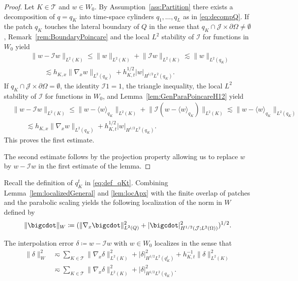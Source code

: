 \documentclass{amsart}
\providecommand{\tria}{\mathcal{T}}
\newcommand{\cJ}{\mathcal J}
\begin{document}
\begin{proof}
Let $K\in \tria$ and $w \in W_0$.
By Assumption~\ref{ass:Partition} there exists a decomposition of $q = q_K$ into time-space cylinders $q_1,\dots,q_L$ as in \eqref{eq:decompQ}. If the patch $q_K$ touches the lateral boundary of $Q$ in the sense that $q_K \cap \cJ\times \partial \Omega \neq \emptyset$, Remark~\ref{rem:BoundaryPoincare} and the local $L^2$ stability of $\mathcal{I}$ for functions in $W_0$ yield
\begin{align*}
&\lVert w - \mathcal{I} w \rVert_{L^2(K)} \leq \lVert w \rVert_{L^2(K)} + \lVert \mathcal{I} w \rVert_{L^2(K)} \lesssim \lVert w \rVert_{L^2(q_K)}\\
&\qquad \lesssim h_{K,x} \lVert \nabla_x w \rVert_{L^2(q_K)} + h_{K,t}^{1/2} \lvert w\rvert_{H^{1/2}L^2(q_K)}.
\end{align*}
%
If $q_K \cap \cJ\times \partial \Omega = \emptyset$, the identity $\mathcal{I}1 = 1$, the triangle inequality, the local $L^2$ stability of $\mathcal{I}$ for functions in $W_0$, and Lemma~\ref{lem:GenParaPoincareH12} yield
\begin{align*}
&\lVert w - \mathcal{I} w \rVert_{L^2(K)} \leq \lVert w - \langle w \rangle_{q_K}\rVert_{L^2(K)} + \lVert \mathcal{I} (w-\langle w \rangle_{q_K})\rVert_{L^2(K)} \lesssim \lVert w-\langle w \rangle_{q_K} \rVert_{L^2(q_K)}\\
&\qquad \lesssim h_{K,x} \lVert \nabla_x w \rVert_{L^2(q_K)} + h_{K,t}^{1/2} \lvert w\rvert_{H^{1/2}L^2(q_K)}.
\end{align*}
This proves the first estimate.
 
The second estimate follows by the projection property allowing us to replace $w$ by $w-\mathcal{I} w$ in the first estimate of the lemma.
\end{proof}
%
Recall the definition of $q_K^t$ in \eqref{eq:def_qKt}.
Combining Lemma~\ref{lem:localizedGeneral} and \ref{lem:locApx} with the finite overlap of patches and the parabolic scaling yields the following localization of the norm in $W$ defined by
\begin{equation}\label{eq:defNormW}
\lVert \bigcdot \rVert_W \coloneqq (\lVert \nabla_x \bigcdot \rVert^2_{L^2(Q)} +  \lvert \bigcdot \rvert_{H^{1/2}(\cJ;L^2(\Omega))}^2)^{1/2}.
\end{equation}
\begin{theorem}\label{thm:LocalizationIIold}
The interpolation error $\delta \coloneqq w - \mathcal{I}w$ with $w\in W_0$ localizes in the sense that 
\begin{align*}
\lVert \delta \rVert_W^2& \eqsim \sum_{K\in \tria}\lVert  \nabla_x \delta \rVert_{L^2(K)}^2 + \lvert  \delta \rvert_{H^{1/2}L^2(q^t_{K})}^2 + h_{K,t}^{-1} \lVert \delta \rVert_{L^2(K)}^2\\
& \eqsim \sum_{K\in \tria}\lVert  \nabla_x \delta \rVert_{L^2(K)}^2 + \lvert  \delta \rvert_{H^{1/2}L^2(q_K)}^2.
\end{align*}
\end{theorem}
\end{document}
